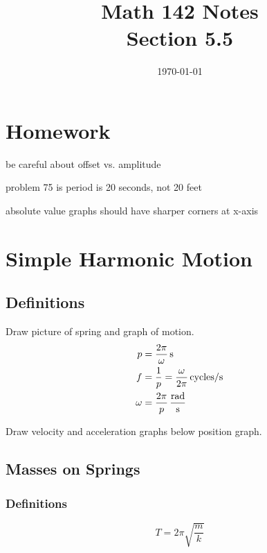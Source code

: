 \documentclass{exam}
\title{Math 142 Notes \\ Section 5.5}
\date{\today}
\begin{document}
  \maketitle
  \tableofcontents

  \pagebreak

  \section{Homework}
  \begin{itemize*}
    \item be careful about offset vs. amplitude
    \item problem 75 is period is 20 seconds, not 20 feet
    \item absolute value graphs should have sharper corners at x-axis
  \end{itemize*}

  \section{Simple Harmonic Motion}

  \subsection{Definitions}
    Draw picture of spring and graph of motion.
    \begin{align*}
      p      & = \unit[ \frac{2 \pi}{\omega} ]{s} \\
      f      & = \frac{1}{p} = \unit[ \frac{\omega}{2 \pi} ]{cycles/s} \\
      \omega & = \unit[ \frac{2 \pi}{p} ]{\frac{rad}{s}} \\
    \end{align*}

    Draw velocity and acceleration graphs below position graph.

  \subsection{Masses on Springs}
  \subsubsection{Definitions}
  \[
    T = 2 \pi \sqrt{\frac{m}{k}}
  \]
          
\end{document}
